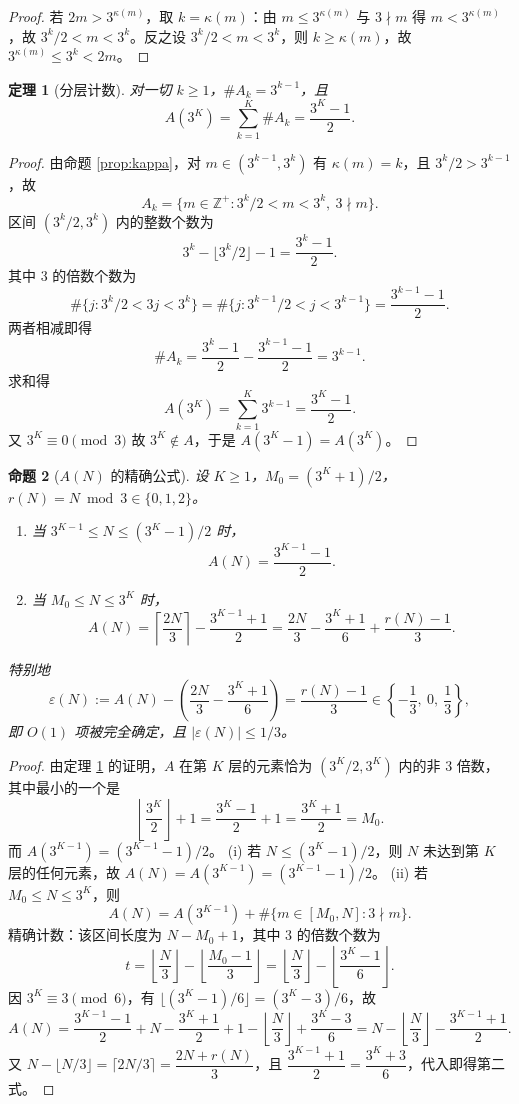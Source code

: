 \documentclass[11pt]{article}
\newtheorem{theorem}{定理}[section]
\newtheorem{proposition}[theorem]{命题}
\theoremstyle{definition}
\theoremstyle{definition}
\theoremstyle{remark}
\begin{document}
\begin{proof}
若 \(2m>3^{\kappa(m)}\)，取 \(k=\kappa(m)\)：由 \(m\le3^{\kappa(m)}\) 与 \(3\nmid m\) 得 \(m<3^{\kappa(m)}\)，故 \(3^k/2<m<3^k\)。反之设 \(3^k/2<m<3^k\)，则 \(k\ge\kappa(m)\)，故 \(3^{\kappa(m)}\le3^k<2m\)。
\end{proof}

\begin{theorem}[分层计数]\label{thm:count}
对一切 \(k\ge1\)，\(\#A_k=3^{k-1}\)，且
\[
A(3^K)=\sum_{k=1}^{K}\#A_k=\frac{3^K-1}{2}.
\]
\end{theorem}

\begin{proof}
由命题 \ref{prop:kappa}，对 \(m\in(3^{k-1},3^k)\) 有 \(\kappa(m)=k\)，且 \(3^k/2>3^{k-1}\)，故
\[
A_k=\{m\in\mathbb Z^+:3^k/2<m<3^k,\ 3\nmid m\}.
\]
区间 \((3^k/2,3^k)\) 内的整数个数为
\[
3^k-\lfloor3^k/2\rfloor-1=\frac{3^k-1}{2}.
\]
其中 3 的倍数个数为
\[
\#\{j:3^k/2<3j<3^k\}=\#\{j:3^{k-1}/2<j<3^{k-1}\}=\frac{3^{k-1}-1}{2}.
\]
两者相减即得
\[
\#A_k=\frac{3^k-1}{2}-\frac{3^{k-1}-1}{2}=3^{k-1}.
\]
求和得
\[
A(3^K)=\sum_{k=1}^{K}3^{k-1}=\frac{3^K-1}{2}.
\]
又 \(3^K\equiv0\pmod3\) 故 \(3^K\notin A\)，于是 \(A(3^K-1)=A(3^K)\)。
\end{proof}

\begin{proposition}[\(A(N)\) 的精确公式]\label{prop:exact}
设 \(K\ge1\)，\(M_0=(3^K+1)/2\)，\(r(N)=N\bmod3\in\{0,1,2\}\)。
\begin{enumerate}
\item 当 \(3^{K-1}\le N\le(3^K-1)/2\) 时，
\[
A(N)=\frac{3^{K-1}-1}{2}.
\]
\item 当 \(M_0\le N\le3^K\) 时，
\[
A(N)=\left\lceil\frac{2N}{3}\right\rceil-\frac{3^{K-1}+1}{2}
=\frac{2N}{3}-\frac{3^K+1}{6}+\frac{r(N)-1}{3}.
\]
\end{enumerate}
特别地
\[
\varepsilon(N):=A(N)-\left(\frac{2N}{3}-\frac{3^K+1}{6}\right)=\frac{r(N)-1}{3}\in\left\{-\frac13,\ 0,\ \frac13\right\},
\]
即 \(O(1)\) 项被完全确定，且 \(|\varepsilon(N)|\le1/3\)。
\end{proposition}

\begin{proof}
由定理 \ref{thm:count} 的证明，\(A\) 在第 \(K\) 层的元素恰为 \((3^K/2,3^K)\) 内的非 3 倍数，其中最小的一个是
\[
\left\lfloor\frac{3^K}{2}\right\rfloor+1=\frac{3^K-1}{2}+1=\frac{3^K+1}{2}=M_0 .
\]
而 \(A(3^{K-1})=(3^{K-1}-1)/2\)。
(i) 若 \(N\le(3^K-1)/2\)，则 \(N\) 未达到第 \(K\) 层的任何元素，故 \(A(N)=A(3^{K-1})=(3^{K-1}-1)/2\)。
(ii) 若 \(M_0\le N\le3^K\)，则
\[
A(N)=A(3^{K-1})+\#\{m\in[M_0,N]:3\nmid m\}.
\]
精确计数：该区间长度为 \(N-M_0+1\)，其中 3 的倍数个数为
\[
t=\left\lfloor\frac N3\right\rfloor-\left\lfloor\frac{M_0-1}{3}\right\rfloor
=\left\lfloor\frac N3\right\rfloor-\left\lfloor\frac{3^K-1}{6}\right\rfloor .
\]
因 \(3^K\equiv3\pmod6\)，有 \(\lfloor(3^K-1)/6\rfloor=(3^K-3)/6\)，故
\[
A(N)=\frac{3^{K-1}-1}{2}+N-\frac{3^K+1}{2}+1-\left\lfloor\frac N3\right\rfloor+\frac{3^K-3}{6}
=N-\left\lfloor\frac N3\right\rfloor-\frac{3^{K-1}+1}{2}.
\]
又 \(N-\lfloor N/3\rfloor=\lceil2N/3\rceil=\dfrac{2N+r(N)}{3}\)，且 \(\dfrac{3^{K-1}+1}{2}=\dfrac{3^K+3}{6}\)，代入即得第二式。
\end{proof}
\end{document}
